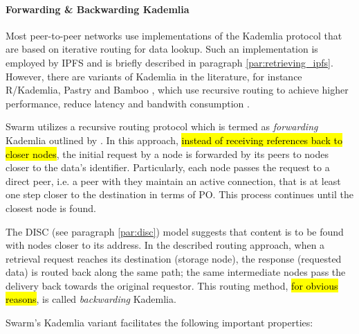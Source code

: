 \paragraph{Forwarding \& Backwarding Kademlia}\label{par:forwarding_kademlia}
Most peer-to-peer networks use implementations of the Kademlia protocol that are based on iterative routing for data lookup. Such an implementation is employed by IPFS and is briefly described in paragraph \ref{par:retrieving_ipfs}. However, there are variants of  Kademlia in the literature, for instance R/Kademlia, Pastry and Bamboo \citep{chowdhury_2017},  which use recursive routing to achieve higher performance, reduce latency and bandwith consumption \citep{heep_2010}.

Swarm utilizes a recursive routing protocol which is termed as \textit{forwarding} Kademlia  outlined by \cite{tron_2018}. In this approach, \hl{instead of receiving references back to closer nodes}, the initial request by a node is forwarded by its peers to nodes closer to the data's identifier. Particularly, each node passes the request to a direct peer, i.e.\add{,} a peer with  they maintain an active connection, that is at least one step closer to the destination in terms of PO. This process continues until the closest node is found.

The DISC (see paragraph \ref{par:disc}) model suggests that content is to be found with nodes closer to its address. In the described routing approach, when a retrieval request reaches its destination (storage node), the response (requested data) is routed back along the same path; the same intermediate nodes pass the delivery back towards the original requestor. This routing method, \hl{for obvious reasons}, is called \textit{backwarding} Kademlia.

Swarm's Kademlia variant facilitates the following important properties:


